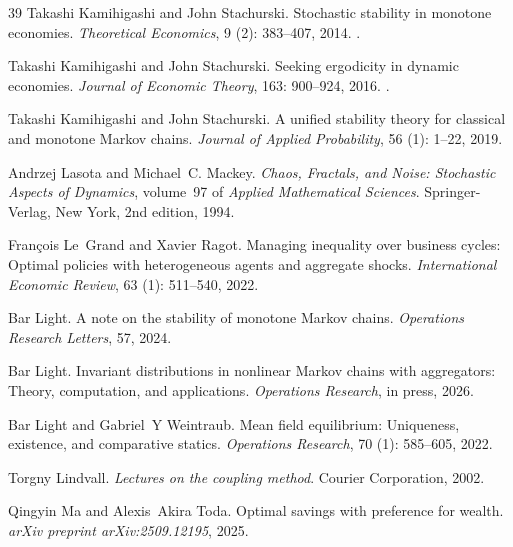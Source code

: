 \documentclass[12pt,reqno]{amsart}
\numberwithin{equation}{section}
\theoremstyle{definition}
\newcommand{\1}{\mathbbm{1}}
\begin{document}
\begin{thebibliography}{39}
Takashi Kamihigashi and John Stachurski.
\newblock Stochastic stability in monotone economies.
\newblock \emph{Theoretical Economics}, 9 (2): 383--407, 2014.
\newblock {}.

Takashi Kamihigashi and John Stachurski.
\newblock Seeking ergodicity in dynamic economies.
\newblock \emph{Journal of Economic Theory}, 163: 900--924, 2016.
\newblock {}.

Takashi Kamihigashi and John Stachurski.
\newblock A unified stability theory for classical and monotone {M}arkov chains.
\newblock \emph{Journal of Applied Probability}, 56 (1): 1--22, 2019.

Andrzej Lasota and Michael~C. Mackey.
\newblock \emph{Chaos, Fractals, and Noise: Stochastic Aspects of Dynamics}, volume~97 of \emph{Applied Mathematical Sciences}.
\newblock Springer-Verlag, New York, 2nd edition, 1994.

Fran{\c{c}}ois Le~Grand and Xavier Ragot.
\newblock Managing inequality over business cycles: Optimal policies with heterogeneous agents and aggregate shocks.
\newblock \emph{International Economic Review}, 63 (1): 511--540, 2022.

Bar Light.
\newblock A note on the stability of monotone {M}arkov chains.
\newblock \emph{Operations Research Letters}, 57, 2024.

Bar Light.
\newblock Invariant distributions in nonlinear {M}arkov chains with aggregators: Theory, computation, and applications.
\newblock \emph{Operations Research}, in press, 2026.

Bar Light and Gabriel~Y Weintraub.
\newblock Mean field equilibrium: Uniqueness, existence, and comparative statics.
\newblock \emph{Operations Research}, 70 (1): 585--605, 2022.

Torgny Lindvall.
\newblock \emph{Lectures on the coupling method}.
\newblock Courier Corporation, 2002.

Qingyin Ma and Alexis~Akira Toda.
\newblock Optimal savings with preference for wealth.
\newblock \emph{arXiv preprint arXiv:2509.12195}, 2025.


\end{thebibliography}
\end{document}
